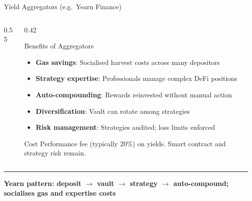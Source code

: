 \documentclass[8pt,aspectratio=169]{beamer}
\newcommand{\bottomnote}[1]{\vfill\vspace{-2mm}\textcolor{mllavender2}{\rule{\textwidth}{0.4pt}}\vspace{1mm}\footnotesize\textbf{#1}}
\begin{document}
\begin{frame}{Yield Aggregators (e.g.\ Yearn Finance)}
\begin{columns}[T]
\begin{column}{0.55\textwidth}
\begin{center}
      \end{center}
    \end{column}
    \begin{column}{0.42\textwidth}
      \begin{block}{Benefits of Aggregators}
        \begin{itemize}\setlength\itemsep{3pt}
          \item \textbf{Gas savings}: Socialised harvest costs across many depositors
          \item \textbf{Strategy expertise}: Professionals manage complex DeFi positions
          \item \textbf{Auto-compounding}: Rewards reinvested without manual action
          \item \textbf{Diversification}: Vault can rotate among strategies
          \item \textbf{Risk management}: Strategies audited; loss limits enforced
        \end{itemize}
      \end{block}
      \begin{alertblock}{Cost}
        Performance fee (typically 20\%) on yields.
        Smart contract and strategy risk remain.
      \end{alertblock}
    \end{column}
  \end{columns}
  \bottomnote{Yearn pattern: deposit $\to$ vault $\to$ strategy $\to$ auto-compound; socialises gas and expertise costs}
\end{frame}
\end{document}
